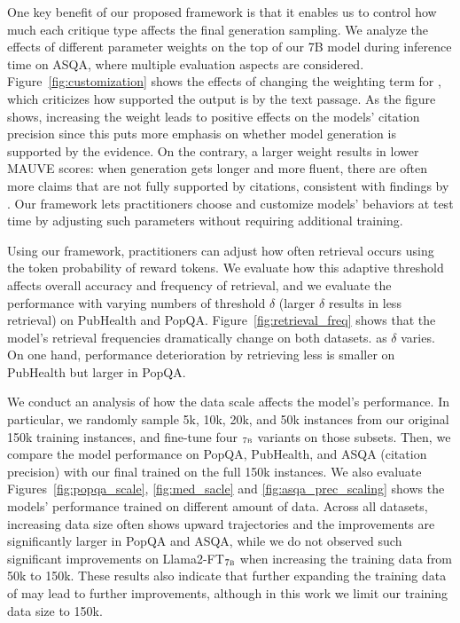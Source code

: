One key benefit of our proposed framework is that it enables us to control how much each critique type affects the final generation sampling. We analyze the effects of different parameter weights on the top of our 7B model during inference time on ASQA, where multiple evaluation aspects are considered. 
Figure~\ref{fig:customization} shows the effects of changing the weighting term for \cgr, which criticizes how supported the output is by the text passage. 
As the figure shows, increasing the weight leads to positive effects on the models' citation precision since this puts more emphasis on whether model generation is supported by the evidence. 
{
On the contrary, a larger weight results in lower MAUVE scores: when generation gets longer and more fluent, there are often more claims that are not fully supported by citations, consistent with findings by \cite{liu2023evaluating}. }
Our framework lets practitioners choose and customize models' behaviors at test time by adjusting such parameters without requiring additional training. 

Using our framework, practitioners can adjust how often retrieval occurs using the token probability of reward tokens. We evaluate how this adaptive threshold affects overall accuracy and frequency of retrieval, and we evaluate the performance with varying numbers of threshold $\delta$ (larger $\delta$ results in less retrieval) on PubHealth and PopQA. 
Figure~\ref{fig:retrieval_freq} shows that the model's retrieval frequencies dramatically change on both datasets. as $\delta$ varies.  
On one hand, performance deterioration by retrieving less is smaller on PubHealth but larger in PopQA. 

{We conduct an analysis of how the data scale affects the model's performance. In particular, we randomly sample 5k, 10k, 20k, and 50k instances from our original 150k training instances, and fine-tune four \model$_{\textsc{7b}}$ variants on those subsets. Then, we compare the model performance on PopQA, PubHealth, and ASQA (citation precision) with our final \model trained on the full 150k instances. 
We also evaluate 
Figures~\ref{fig:popqa_scale}, \ref{fig:med_sacle} and \ref{fig:asqa_prec_scaling} shows the models' performance trained on different amount of data. 
Across all datasets, increasing data size often shows upward trajectories and the improvements are significantly larger in PopQA and ASQA, while we do not observed such significant improvements on Llama2-FT$_{\textsc{7b}}$ when increasing the training data from 50k to 150k. 
These results also indicate that further expanding the training data of \model may lead to further improvements, although in this work we limit our training data size to 150k. 
}

